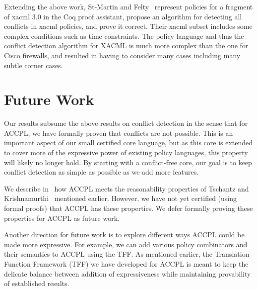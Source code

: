 \documentclass[conference]{IEEEtran}
\begin{document}
Extending the above work, St-Martin and Felty~\cite{felty16} represent
policies for a fragment of \ac{xacml} 3.0 in the Coq proof assistant,
propose an algorithm for detecting all conflicts in \ac{xacml}
policies, and prove it correct. Their \ac{xacml} subset includes some
complex conditions such as time constraints. The policy language and
thus the conflict detection algorithm for XACML is much more complex
than the one for Cisco firewalls, and resulted in having to consider
many cases including many subtle corner cases.

\section{Future Work}


Our results subsume the above results on conflict detection in the
sense that for \ac{ACCPL}, we have formally proven that conflicts are
not possible. This is an important aspect of our small certified core
language, but as this core is extended to cover more of the expressive
power of existing policy languages, this property will likely no
longer hold. By starting with a conflict-free core, our goal is to
keep conflict detection as simple as possible as we add more features.

We describe in~\cite{BahPhd} how \ac{ACCPL} meets the reasonability
properties of Tschantz and Krishnamurthi~\cite{Tschantz} mentioned
earlier.  However, we have not yet certified (using formal proofs)
that \ac{ACCPL} has these properties. We defer formally proving these
properties for \ac{ACCPL} as future work.

Another direction for future work is to explore different ways \ac{ACCPL} could be made more expressive. For example, we can add various policy combinators and their semantics to \ac{ACCPL} using the TFF. As mentioned earlier, the Translation Function Framework (TFF) we have developed for \ac{ACCPL} is meant to keep the delicate balance between addition of expressiveness while maintaining provability of established results.
\end{document}
